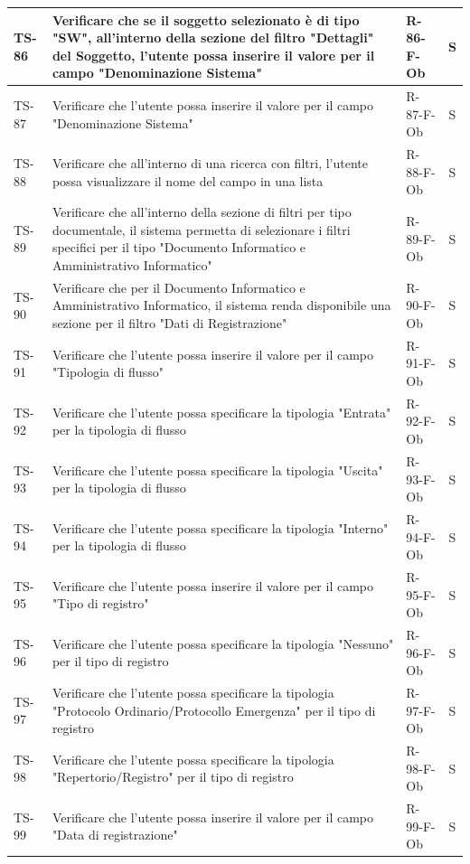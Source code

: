 \documentclass[a4paper,12pt]{article}
\begin{document}
\begin{longtable}{|p{1.5cm}|p{8.3cm}|p{2.4cm}|c|}
\hline
TS-86 & Verificare che se il soggetto selezionato è di tipo "SW", all'interno della sezione del filtro "Dettagli" del Soggetto, l'utente possa inserire il valore per il campo "Denominazione Sistema" & R-86-F-Ob & S \\
\hline
TS-87 & Verificare che l'utente possa inserire il valore per il campo "Denominazione Sistema" & R-87-F-Ob & S \\
\hline
TS-88 & Verificare che all'interno di una ricerca con filtri, l'utente possa visualizzare il nome del campo in una lista & R-88-F-Ob & S \\
\hline
TS-89 & Verificare che all'interno della sezione di filtri per tipo documentale, il sistema permetta di selezionare i filtri specifici per il tipo "Documento Informatico e Amministrativo Informatico" & R-89-F-Ob & S \\
\hline
TS-90 & Verificare che per il Documento Informatico e Amministrativo Informatico, il sistema renda disponibile una sezione per il filtro "Dati di Registrazione" & R-90-F-Ob & S \\
\hline
TS-91 & Verificare che l'utente possa inserire il valore per il campo "Tipologia di flusso" & R-91-F-Ob & S \\
\hline
TS-92 & Verificare che l'utente possa specificare la tipologia "Entrata" per la tipologia di flusso & R-92-F-Ob & S \\
\hline
TS-93 & Verificare che l'utente possa specificare la tipologia "Uscita" per la tipologia di flusso & R-93-F-Ob & S \\
\hline
TS-94 & Verificare che l'utente possa specificare la tipologia "Interno" per la tipologia di flusso & R-94-F-Ob & S \\
\hline
TS-95 & Verificare che l'utente possa inserire il valore per il campo "Tipo di registro" & R-95-F-Ob & S \\
\hline
TS-96 & Verificare che l'utente possa specificare la tipologia "Nessuno" per il tipo di registro & R-96-F-Ob & S \\
\hline
TS-97 & Verificare che l'utente possa specificare la tipologia "Protocolo Ordinario/Protocollo Emergenza" per il tipo di registro & R-97-F-Ob & S \\
\hline
TS-98 & Verificare che l'utente possa specificare la tipologia "Repertorio/Registro" per il tipo di registro & R-98-F-Ob & S \\
\hline
TS-99 & Verificare che l'utente possa inserire il valore per il campo "Data di registrazione" & R-99-F-Ob & S \\

\end{longtable}
\end{document}
